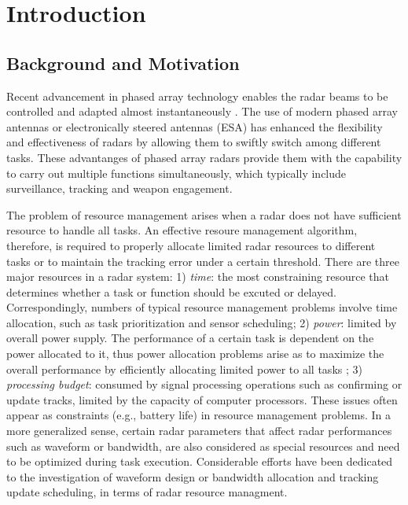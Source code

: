 \documentclass[12pt,journal,draftclsnofoot,onecolumn]{IEEEtran}
\begin{document}
\section{Introduction}
\subsection{Background and Motivation}
Recent advancement in phased array technology enables the radar beams to be controlled and adapted almost instantaneously \cite{fenn2000development,van1993phased,orman1996scheduling}. The use of modern phased array antennas or electronically steered antennas (ESA) has enhanced the flexibility and effectiveness of radars by allowing them to swiftly switch among different tasks. These advantanges of phased array radars provide them with the capability to carry out multiple functions simultaneously, which typically include surveillance, tracking and weapon engagement.

The problem of resource management\cite{ding2008survey,moo2015adaptive,punithakumar2006multisensor,tharmarasa2007pcrlb,hero2011sensor,schmaedeke1993information} arises when a radar does not have sufficient resource to handle all tasks. An effective resoure management algorithm, therefore, is required to properly allocate limited radar resources to different tasks or to maintain the tracking error under a certain threshold. There are three major resources in a radar system: 1) \emph{time}: the most constraining resource that determines whether a task or function should be excuted or delayed. Correspondingly, numbers of typical resource management problems involve time allocation, such as task prioritization\cite{kuo2005real} and sensor scheduling\cite{narykov2013algorithm}; 2) \emph{power}: limited by overall power supply. The performance of a certain task is dependent on the power allocated to it, thus power allocation problems arise as to maximize the overall performance by efficiently allocating limited power to all tasks \cite{she2016novel,yan2015simultaneous}; 3) \emph{processing budget}: consumed by signal processing operations such as confirming or update tracks, limited by the capacity of computer processors\cite{tharmarasa2019closed}. These issues often appear as constraints (e.g., battery life) in resource management problems. In a more generalized sense, certain radar parameters that affect radar performances such as waveform or bandwidth, are also considered as special resources and need to be optimized during task execution.  Considerable efforts have been dedicated to the investigation of waveform design\cite{kershaw1994optimal} or bandwidth allocation\cite{paris2019genetic} and tracking update scheduling\cite{hong1998optimal}, in terms of radar resource managment.
\end{document}

